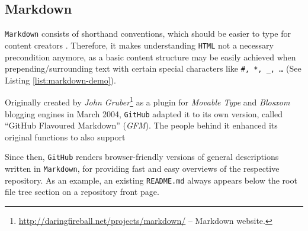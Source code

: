 \subsection{Markdown}
\label{sec:buildpipelines-markdown}



\texttt{Markdown} consists of shorthand conventions, which should be easier to type for content creators  \cite[38]{dhillon2016}.
Therefore, it makes understanding \texttt{HTML} not a necessary precondition anymore, as a basic content structure may be easily achieved when prepending/surrounding text with certain special characters like \texttt{\#, *, \_, \ldots} (See Listing \ref{list:markdown-demo}).

Originally created by \emph{John Gruber}\footnote{\url{http://daringfireball.net/projects/markdown/} -- Markdown website.} as a plugin for \emph{Movable Type} and \emph{Blosxom} blogging engines \cite{Markdown2004introduction} in March 2004, \texttt{GitHub} adapted it to its own version, called ``GitHub Flavoured Markdown'' (\emph{GFM}). The people behind it enhanced its original functions to also support %

Since then, \texttt{GitHub} renders browser-friendly versions of general descriptions written in \texttt{Markdown}, for providing fast and easy overviews of the respective repository. As an example, an existing \texttt{README.md} always appears below the root file tree section on a repository front page.
